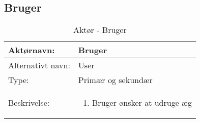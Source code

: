 
\subsection{Bruger}

\begin{table}[H]
\centering
\begin{tabular}[\textwidth]{|p{}|p{}|}
\hline Aktørnavn: & Bruger \\ 
\hline Alternativt navn: & User \\ 
\hline Type: & Primær og sekundær\\ 
\hline Beskrivelse: & 
		\begin{enumerate}
		\item Bruger ønsker at udruge æg
		\end{enumerate} \\ 
\hline
\end{tabular}
\caption{Aktør - Bruger}
\label{tab:usecase-aktoer-bruger}
\end{table}

